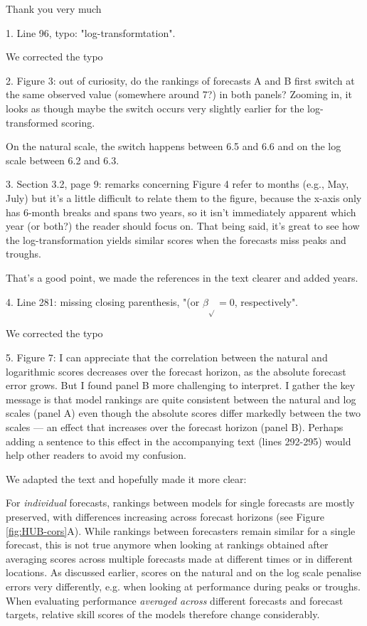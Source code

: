 \documentclass{article}
\newcommand{\black}{\color{black}}
\newcommand{\blue}{\color{blue}}
\begin{document}
\black
Thank you very much

\blue
1. Line 96, typo: "log-transformtation".

\black
We corrected the typo

\blue
2. Figure 3: out of curiosity, do the rankings of forecasts A and B first switch at the same observed value (somewhere around 7?) in both panels? Zooming in, it looks as though maybe the switch occurs very slightly earlier for the log-transformed scoring.

\black
On the natural scale, the switch happens between 6.5 and 6.6 and on the log scale between 6.2 and 6.3. 

\blue
3. Section 3.2, page 9: remarks concerning Figure 4 refer to months (e.g., May, July) but it's a little difficult to relate them to the figure, because the x-axis only has 6-month breaks and spans two years, so it isn't immediately apparent which year (or both?) the reader should focus on. That being said, it's great to see how the log-transformation yields similar scores when the forecasts miss peaks and troughs.

\black
That's a good point, we made the references in the text clearer and added years. 

\blue
4. Line 281: missing closing parenthesis, "(or $\beta_{\sqrt{}} = 0$, respectively".

\black
We corrected the typo

\blue
5. Figure 7: I can appreciate that the correlation between the natural and logarithmic scores decreases over the forecast horizon, as the absolute forecast error grows. But I found panel B more challenging to interpret. I gather the key message is that model rankings are quite consistent between the natural and log scales (panel A) even though the absolute scores differ markedly between the two scales — an effect that increases over the forecast horizon (panel B). Perhaps adding a sentence to this effect in the accompanying text (lines 292-295) would help other readers to avoid my confusion.

\black
We adapted the text and hopefully made it more clear: 

For \textit{individual} forecasts, rankings between models for single forecasts are mostly preserved, with differences increasing across forecast horizons (see Figure \ref{fig:HUB-cors}A). While rankings between forecasters remain similar for a single forecast, this is not true anymore when looking at rankings obtained after averaging scores across multiple forecasts made at different times or in different locations. As discussed earlier, scores on the natural and on the log scale penalise errors very differently, e.g. when looking at performance during peaks or troughs. When evaluating performance \textit{averaged across} different forecasts and forecast targets, relative skill scores of the models therefore change considerably.
\end{document}
